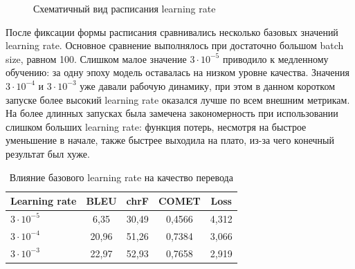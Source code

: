 \begin{figure}[H]
	\centering
	\caption{Схематичный вид расписания learning rate}
	\label{fig:lr-schedule}
\end{figure}

После фиксации формы расписания сравнивались несколько базовых значений learning rate.
Основное сравнение выполнялось при достаточно большом batch size, равном 100.
Слишком малое значение $3 \cdot 10^{-5}$ приводило к медленному обучению: за одну эпоху модель оставалась на низком уровне качества.
Значения $3 \cdot 10^{-4}$ и $3 \cdot 10^{-3}$ уже давали рабочую динамику, при этом в данном коротком запуске более высокий learning rate оказался лучше по всем внешним метрикам.
На более длинных запусках была замечена закономерность при использовании слишком больших learning rate: функция потерь, несмотря на быстрое уменьшение в начале, также быстрее выходила на плато, из-за чего конечный результат был хуже.

\begin{table}[H]
	\centering
	\caption{Влияние базового learning rate на качество перевода}
	\label{tab:lr-comparison}
	\begin{tabular}{|p{}|c|c|c|c|}
		\hline
		\textbf{Learning rate} & \textbf{BLEU} & \textbf{chrF} & \textbf{COMET} & \textbf{Loss} \\
		\hline
		$3 \cdot 10^{-5}$      & 6{,}35        & 30{,}49       & 0{,}4566       & 4{,}312       \\
		\hline
		$3 \cdot 10^{-4}$      & 20{,}96       & 51{,}26       & 0{,}7384       & 3{,}066       \\
		\hline
		$3 \cdot 10^{-3}$      & 22{,}97       & 52{,}93       & 0{,}7658       & 2{,}919       \\
		\hline
	\end{tabular}
\end{table}

